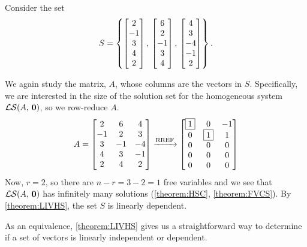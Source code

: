 \documentclass{ximera}
\begin{document}
\begin{example}%
  Consider the set
  \[
    S=\left\{
      \begin{bmatrix}2\\-1\\3\\4\\2\end{bmatrix},\,
      \begin{bmatrix}6\\2\\-1\\3\\4\end{bmatrix},\,
      \begin{bmatrix}4\\3\\-4\\-1\\2\end{bmatrix}
    \right\}.
  \]
  \begin{multipleChoice}
  \end{multipleChoice}

  \begin{explanation}
    We again study the matrix, $A$, whose columns are the vectors in
    $S$.  Specifically, we are interested in the size of the solution
    set for the homogeneous system $\mathcal{LS}\!\left(A,\,\mathbf{0}\right)$, so we row-reduce
    $A$.
    \[
      A=
      \begin{bmatrix}
        2 & 6 & 4\\
        -1 & 2 & 3\\
        3 & -1 & -4\\
        4 & 3 & -1\\
        2 & 4 & 2
      \end{bmatrix}
      \xrightarrow{\text{RREF}}
      \begin{bmatrix}
        \fbox{1} & 0 & -1\\
        0 & \fbox{1} & 1\\
        0 & 0 & 0\\
        0 & 0 & 0\\
        0 & 0 & 0
      \end{bmatrix}
    \]
    Now, $r=2$, so there are $n-r=3-2=1$ free variables and we see
    that $\mathcal{LS}\!\left(A,\,\mathbf{0}\right)$ has infinitely many solutions
    (\ref{theorem:HSC}, \ref{theorem:FVCS}).  By \ref{theorem:LIVHS},
    the set $S$ is linearly dependent.
  \end{explanation}
\end{example}

As an equivalence, \ref{theorem:LIVHS} gives us a straightforward way
to determine if a set of vectors is linearly independent or dependent.
\end{document}
